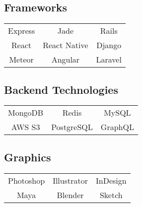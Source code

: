 \documentclass[letterpaper]{deedy-resume} %
\begin{document}
\begin{minipage}[t]{0.33\textwidth}
  \vspace{4mm}

  \subsection{Frameworks}

  \begin{tabular}{ c c c }
    Express & Jade & Rails \\
    React & React Native & Django \\
    Meteor & Angular & Laravel
  \end{tabular}

  \vspace{4mm}

  \subsection{Backend Technologies}

  \begin{tabular}{ c c c }
    MongoDB & Redis & MySQL \\
    AWS S3 & PostgreSQL & GraphQL
  \end{tabular}

  \vspace{4mm}

  \subsection{Graphics}

  \begin{tabular}{ c c c }
    Photoshop & Illustrator & InDesign \\
    Maya & Blender & Sketch
  \end{tabular}

  \sectionspace %



\end{minipage} %
\hfill
%
%
\end{document}
